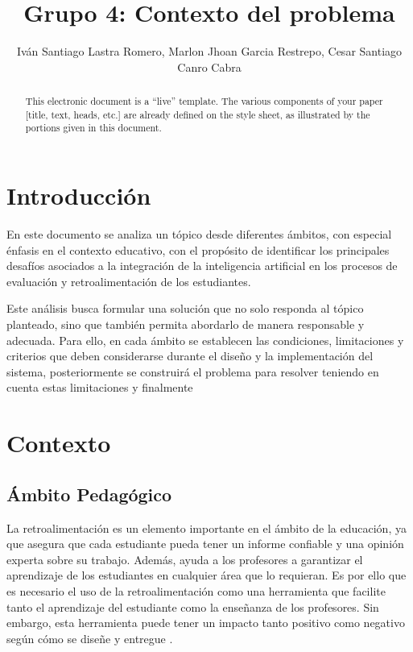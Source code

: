 \documentclass[letterpaper, 10 pt, conference]{ieeeconf}  %
\title{\LARGE \bf
Grupo 4: Contexto del problema
}
\author{Iván Santiago Lastra Romero, Marlon Jhoan Garcia Restrepo, Cesar Santiago Canro Cabra}
\begin{document}
\maketitle
\thispagestyle{empty}
\pagestyle{empty}


\begin{abstract}

This electronic document is a ``live'' template. The various components of your paper [title, text, heads, etc.] are already defined on the style sheet, as illustrated by the portions given in this document.

\end{abstract}



\section{Introducción}

En este documento se analiza un tópico desde diferentes ámbitos, con especial énfasis en el contexto educativo, con el propósito de identificar los principales desafíos asociados a la integración de la inteligencia artificial en los procesos de evaluación y retroalimentación de los estudiantes.

Este análisis busca formular una solución que no solo responda al tópico planteado, sino que también permita abordarlo de manera responsable y adecuada. Para ello, en cada ámbito se establecen las condiciones, limitaciones y criterios que deben considerarse durante el diseño y la implementación del sistema, posteriormente se construirá el problema para resolver teniendo en cuenta estas limitaciones y finalmente 
\section{Contexto}
    \subsection{Ámbito Pedagógico} 
    La retroalimentación es un elemento importante en el ámbito de la educación, ya que asegura que cada estudiante pueda tener un informe confiable y una opinión experta sobre su trabajo. Además, ayuda a los profesores a garantizar el aprendizaje de los estudiantes en cualquier área que lo requieran. Es por ello que es necesario el uso de la retroalimentación como una herramienta que facilite tanto el aprendizaje del estudiante como la enseñanza de los profesores. Sin embargo, esta herramienta puede tener un impacto tanto positivo como negativo según cómo se diseñe y entregue \cite{1}.
\end{document}
